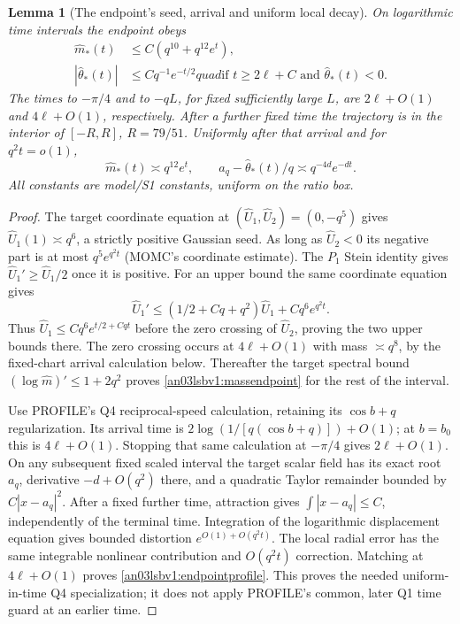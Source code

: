 \documentclass[11pt]{article}
\newtheorem{lemma}[theorem]{Lemma}
\theoremstyle{remark}\newtheorem{remark}[theorem]{Remark}
\begin{document}
\begin{lemma}[The endpoint's seed, arrival and uniform local decay]
\label{an03lsbv1:endpoint}
On logarithmic time intervals the endpoint obeys
\begin{align}
 \widehat m_*(t)&\le C(q^{10}+q^{12}e^t),
 \label{an03lsbv1:massendpoint}\\
 |\widehat\theta_*(t)|&\le Cq^{-1}e^{-t/2}quad
       \text{if }t\ge2\ell+C\text{ and }\widehat\theta_*(t)<0.
 \label{an03lsbv1:angleendpoint}
\end{align}
The times to $-\pi/4$ and to $-qL$, for fixed sufficiently large $L$,
are $2\ell+O(1)$ and $4\ell+O(1)$, respectively. After a further fixed
time the trajectory is in the interior of $[-R,R]$, $R=79/51$.
Uniformly after that arrival and for $q^2t=o(1)$,
\begin{equation}
 \widehat m_*(t)\asymp q^{12}e^t,\qquad
 a_q-\widehat\theta_*(t)/q\asymp q^{-4d}e^{-dt}.
 \label{an03lsbv1:endpointprofile}
\end{equation}
All constants are model/S1 constants, uniform on the ratio box.
\end{lemma}
\begin{proof}
The target coordinate equation at $(\widehat U_1,\widehat U_2)
=(0,-q^5)$ gives $\widehat U_1(1)\asymp q^6$, a strictly positive
Gaussian seed. As long as $\widehat U_2<0$ its negative part is at
most $q^5e^{q^2t}$ (MOMC's coordinate estimate). The $P_1$ Stein
identity gives $\widehat U_1'\ge\widehat U_1/2$ once it is positive.
For an upper bound the same coordinate equation gives
\[
 \widehat U_1'\le(1/2+Cq+q^2)\widehat U_1
                       +Cq^6e^{q^2t}.
\]
Thus $\widehat U_1\le Cq^6e^{t/2+Cqt}$ before the zero crossing of
$\widehat U_2$, proving the two upper bounds there. The zero crossing
occurs at $4\ell+O(1)$ with mass $\asymp q^8$, by the fixed-chart
arrival calculation below. Thereafter the target spectral bound
$(\log\widehat m)'\le1+2q^2$ proves
\eqref{an03lsbv1:massendpoint} for the rest of the interval.

Use PROFILE's Q4 reciprocal-speed calculation, retaining its
$\cos b+q$ regularization. Its arrival time is
$2\log(1/[q(\cos b+q)])+O(1)$; at $b=b_0$ this is $4\ell+O(1)$.
Stopping that same calculation at $-\pi/4$ gives $2\ell+O(1)$.
On any subsequent fixed scaled interval the target scalar field has
its exact root $a_q$, derivative $-d+O(q^2)$ there, and a quadratic
Taylor remainder bounded by $C|x-a_q|^2$. After a fixed further time,
attraction gives $\int|x-a_q|\le C$, independently of the terminal
time. Integration of the logarithmic displacement equation gives
bounded distortion $e^{O(1)+O(q^2t)}$. The local radial error has the
same integrable nonlinear contribution and $O(q^2t)$ correction.
Matching at $4\ell+O(1)$ proves \eqref{an03lsbv1:endpointprofile}.
This proves the needed uniform-in-time Q4 specialization; it does
not apply PROFILE's common, later Q1 time guard at an earlier time.
\end{proof}
\end{document}

